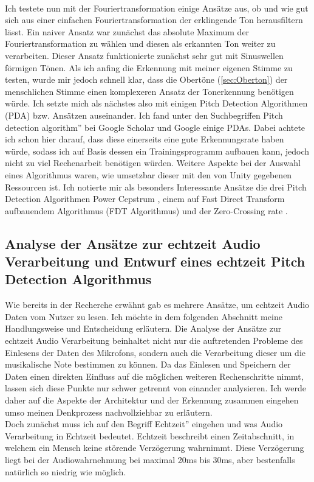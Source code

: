 \\
Ich testete nun mit der Fouriertransformation einige Ansätze aus, ob und wie gut sich aus einer einfachen Fouriertransformation der erklingende Ton herausfiltern lässt. Ein naiver Ansatz war zunächst das absolute Maximum der Fouriertransformation zu wählen und diesen als erkannten Ton weiter zu verarbeiten. Dieser Ansatz funktionierte zunächst sehr gut mit Sinuswellen förmigen Tönen. Als ich anfing die Erkennung mit meiner eigenen Stimme zu testen, wurde mir jedoch schnell klar, dass die Obertöne (\ref{sec:Oberton}) der menschlichen Stimme einen komplexeren Ansatz der Tonerkennung benötigen würde. Ich setzte mich als nächstes also mit einigen Pitch Detection Algorithmen (PDA) bzw. Ansätzen auseinander. Ich fand unter den Suchbegriffen \glqq Pitch detection algorithm'' bei Google Scholar und Google einige PDAs. Dabei achtete ich schon hier darauf, dass diese einerseits eine gute Erkennungsrate haben würde, sodass ich auf Basis dessen ein Trainingsprogramm aufbauen kann, jedoch nicht zu viel Rechenarbeit benötigen würden. Weitere Aspekte bei der Auswahl eines Algorithmus waren, wie umsetzbar dieser mit den von Unity gegebenen Ressourcen ist. Ich notierte mir als besonders Interessante Ansätze die drei Pitch Detection Algorithmen Power Cepstrum \cite{norton2003fundamentals}, einem auf Fast Direct Transform aufbauendem Algorithmus (FDT Algorithmus) \cite{yazama2005simple} und der Zero-Crossing rate \cite{amado2008pitch}. 


\subsection{Analyse der Ansätze zur echtzeit Audio Verarbeitung und Entwurf eines echtzeit Pitch Detection Algorithmus}

\label{sec:analyse_echtzeit}
Wie bereits in der Recherche erwähnt gab es mehrere Ansätze, um echtzeit Audio Daten vom Nutzer zu lesen. Ich möchte in dem folgenden Abschnitt meine Handlungsweise und Entscheidung erläutern. 
Die Analyse der Ansätze zur echtzeit Audio Verarbeitung beinhaltet nicht nur die auftretenden Probleme des Einlesens der Daten des Mikrofons, sondern auch die Verarbeitung dieser um die musikalische Note bestimmen zu können. Da das Einlesen und Speichern der Daten einen direkten Einfluss auf die möglichen weiteren Rechenschritte nimmt, lassen sich diese Punkte nur schwer getrennt von einander analysieren. Ich werde daher auf die Aspekte der Architektur und der Erkennung zusammen eingehen umso meinen Denkprozess nachvollziehbar zu erläutern. \\
Doch zunächst muss ich auf den Begriff \glqq Echtzeit''  eingehen und was Audio Verarbeitung in Echtzeit bedeutet. Echtzeit beschreibt einen Zeitabschnitt, in welchem ein Mensch keine störende Verzögerung wahrnimmt. Diese Verzögerung liegt bei der Audiowahrnehmung bei maximal 20ms bis 30ms, aber bestenfalls natürlich so niedrig wie möglich. \cite{lago2004quest}\\ %

